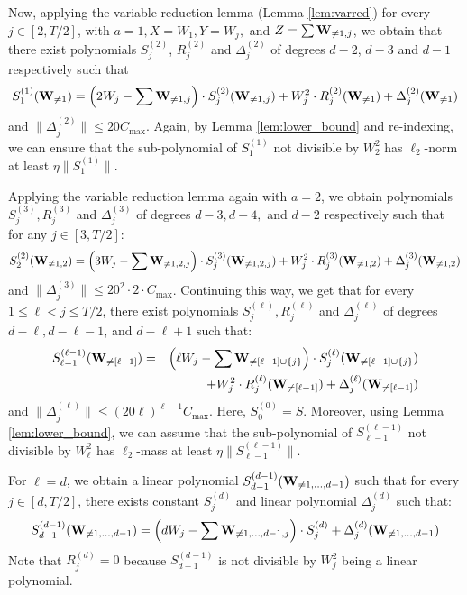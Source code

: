 Now, applying the variable reduction lemma (Lemma \ref{lem:varred})  for every $j \in [2, T/2]$, with $a=1, X=W_1, Y=W_j,$ and $Z = \sum \mathbf{W}_{\neq 1,j}$, we obtain that there exist polynomials $S^{(2)}_j$, $R^{(2)}_j$ and $\Delta^{(2)}_j$ of degrees $d-2$, $d-3$ and $d-1$ respectively such that
$$S^{(1)}_1(\mathbf{W}_{\neq 1}) = \left(2W_j - \sum \mathbf{W}_{\neq 1, j}\right) \cdot S^{(2)}_j(\mathbf{W}_{\neq 1,j}) + W_j^2 \cdot R^{(2)}_j(\mathbf{W}_{\neq 1}) + \Delta_j^{(2)}(\mathbf{W}_{\neq 1})
$$
and $\|\Delta_j^{(2)}\| \leq 20C_{\max}$. Again, by Lemma \ref{lem:lower_bound} and re-indexing, we can ensure that the sub-polynomial of $S_1^{(1)}$ not divisible by $W_2^2$ has $\ell_2$-norm at least $\eta \|S^{(1)}_1\|$. 
 
Applying the variable reduction lemma again with $a=2$, we obtain polynomials $S_j^{(3)}, R_j^{(3)}$ and $\Delta_j^{(3)}$ of degrees $d-3, d-4,$ and $d-2$ respectively such that for any $j \in [3,T/2]$:
$$S^{(2)}_2(\mathbf{W}_{\neq 1,2}) = \left(3W_j - \sum \mathbf{W}_{\neq 1, 2, j}\right) \cdot S^{(3)}_j(\mathbf{W}_{\neq 1,2, j}) + W_j^2 \cdot R^{(3)}_j(\mathbf{W}_{\neq 1,2}) + \Delta_j^{(3)}(\mathbf{W}_{\neq 1,2})
$$
and $\|\Delta_j^{(3)}\| \leq 20^2 \cdot 2 \cdot C_{\max}$. Continuing this way, we get that for every $1\leq \ell < j \leq T/2$, there exist polynomials $S^{(\ell)}_j, R^{(\ell)}_j$ and $\Delta^{(\ell)}_j$ of degrees $d-\ell, d-\ell-1$, and $d-\ell+1$ such that:
\begin{eqnarray}
S^{(\ell-1)}_{\ell-1}(\mathbf{W}_{\neq [\ell-1]}) & = & \left(\ell W_j - \sum \mathbf{W}_{\neq [\ell-1]\cup \{j\}}\right) \cdot S^{(\ell)}_j(\mathbf{W}_{\neq [\ell-1] \cup \{j\}}) \nonumber \\
& & + W_j^2\cdot R^{(\ell)}_j(\mathbf{W}_{\neq [\ell-1]}) + \Delta_j^{(\ell)}(\mathbf{W}_{\neq [\ell-1]})\label{eqn:genl}
\end{eqnarray}
and $\|\Delta_j^{(\ell)}\| \leq (20\ell)^{\ell-1} C_{\max}$.  Here, $S_0^{(0)} = S$. Moreover, using Lemma \ref{lem:lower_bound}, we can assume that the sub-polynomial of $S_{\ell-1}^{(\ell-1)}$ not divisible by $W_\ell^2$ has $\ell_2$-mass at least $\eta \|S^{(\ell-1)}_{\ell-1}\|$. 

For $\ell = d$, we obtain a linear polynomial $S^{(d-1)}_{d-1}(\mathbf{W}_{\neq 1, \dots, d-1})$ such that for every $j \in [d, T/2]$, there exists constant $S^{(d)}_j$ and linear polynomial $\Delta^{(d)}_j$ such that:
$$S_{d-1}^{(d-1)}(\mathbf{W}_{\neq 1, \dots, d-1}) = \left(dW_j - \sum \mathbf{W}_{\neq 1,\dots,d-1, j}\right) \cdot S^{(d)}_j + \Delta^{(d)}_j(\mathbf{W}_{\neq 1, \dots, d-1})
$$
Note that $R_j^{(d)} = 0$ because $S^{(d-1)}_{d-1}$ is not divisible by $W_j^2$ being a linear polynomial. 

